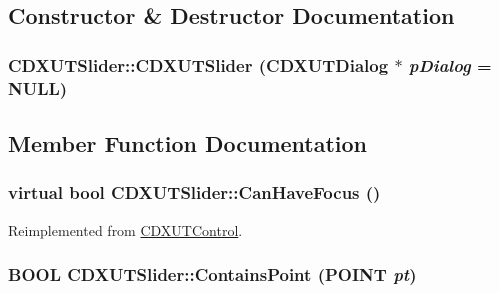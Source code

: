 \subsection{Constructor \& Destructor Documentation}
\hypertarget{class_c_d_x_u_t_slider_ae7a6fff7f9d0e05058b980e952e4bd7b}{
\subsubsection[{CDXUTSlider}]{\setlength{\rightskip}{0pt plus 5cm}CDXUTSlider::CDXUTSlider ({\bf CDXUTDialog} $\ast$ {\em pDialog} = {\ttfamily NULL})}}
\label{class_c_d_x_u_t_slider_ae7a6fff7f9d0e05058b980e952e4bd7b}


\subsection{Member Function Documentation}
\hypertarget{class_c_d_x_u_t_slider_afbda40a898fbc1424759bc530899475d}{
\subsubsection[{CanHaveFocus}]{\setlength{\rightskip}{0pt plus 5cm}virtual bool CDXUTSlider::CanHaveFocus ()}}
\label{class_c_d_x_u_t_slider_afbda40a898fbc1424759bc530899475d}


Reimplemented from \hyperlink{class_c_d_x_u_t_control_a5b2c6c474236a79b257c86caded9c0b7}{CDXUTControl}.\hypertarget{class_c_d_x_u_t_slider_a8c3b16c9ae0c7aa68797f58aced30d16}{
\subsubsection[{ContainsPoint}]{\setlength{\rightskip}{0pt plus 5cm}BOOL CDXUTSlider::ContainsPoint (POINT {\em pt})}}
\label{class_c_d_x_u_t_slider_a8c3b16c9ae0c7aa68797f58aced30d16}


